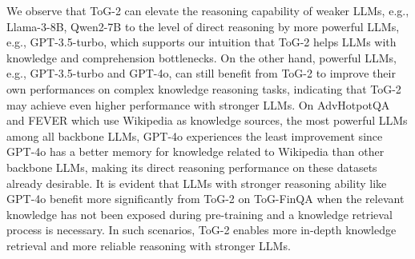 \documentclass{article} %
\begin{document}
We observe that ToG-2 can elevate the reasoning capability of weaker LLMs, e.g., Llama-3-8B, Qwen2-7B to the level of direct reasoning by more powerful LLMs, e.g., GPT-3.5-turbo, which supports our intuition that ToG-2 helps LLMs with knowledge and comprehension bottlenecks. On the other hand, powerful LLMs, e.g., GPT-3.5-turbo and GPT-4o, can still benefit from ToG-2 to improve their own performances on complex knowledge reasoning tasks, indicating that ToG-2 may achieve even higher performance with stronger LLMs. On AdvHotpotQA and FEVER which use Wikipedia as knowledge sources, the most powerful LLMs among all backbone LLMs, GPT-4o experiences the least improvement since GPT-4o has a better memory for knowledge related to Wikipedia than other backbone LLMs, making its direct reasoning performance on these datasets already desirable. It is evident that LLMs with stronger reasoning ability like GPT-4o benefit more significantly from ToG-2 on ToG-FinQA when the relevant knowledge has not been exposed during pre-training and a knowledge retrieval process is necessary. In such scenarios, ToG-2 enables more in-depth knowledge retrieval and more reliable reasoning with stronger LLMs.




\end{document}
